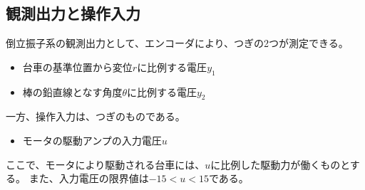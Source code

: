 \subsection{観測出力と操作入力}
倒立振子系の観測出力として、エンコーダにより、つぎの2つが測定できる。\\
\begin{itemize}
  \item 台車の基準位置から変位$r$に比例する電圧$y_{1}$
  \item 棒の鉛直線となす角度$\theta$に比例する電圧$y_{2}$
\end{itemize}
一方、操作入力は、つぎのものである。
\begin{itemize}
  \item モータの駆動アンプの入力電圧$u$
\end{itemize}
ここで、モータにより駆動される台車には、$u$に比例した駆動力が働くものとする\cite{Koga:Binpe}。
また、入力電圧の限界値は$-15<u<15$である。


